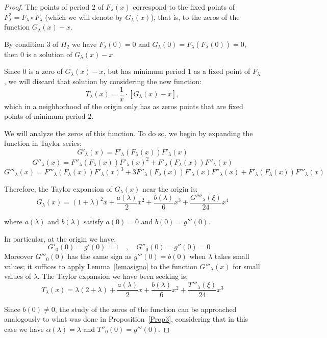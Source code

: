 \documentclass[12pt,a4paper]{report}
\theoremstyle{definition}
\begin{document}
\begin{proof}
The points of period \( 2 \) of \( F_{\lambda}(x) \) correspond to the fixed points of \( F^2_{\lambda} = F_{\lambda} \circ F_{\lambda} \) (which we will denote by \( G_{\lambda}(x) \)), that is, to the zeros of the function \( G_{\lambda}(x) - x \).

By condition 3 of \( H_2 \) we have \( F_{\lambda}(0) = 0 \) and \( G_{\lambda}(0) = F_{\lambda}(F_{\lambda}(0)) = 0 \), then \( 0 \) is a solution of \( G_{\lambda}(x) - x \).

Since $0$ is a zero of $G_\lambda(x)-x$, but has minimum period $1$ as a fixed point of $F_\lambda$, we will discard that solution by considering the new function:
\[
T_{\lambda}(x) = \frac{1}{x} \cdot [ G_{\lambda}(x) - x ],
\]
which in a neighborhood of the origin only has as zeros points that are fixed points of minimum period \( 2 \). 

We will analyze the zeros of this function. To do so, we begin by expanding the function in Taylor series:
\[
G'_{\lambda}(x) = F'_{\lambda}(F_{\lambda}(x)) F'_{\lambda}(x)
\]
\[
G''_{\lambda}(x) = F''_{\lambda}(F_{\lambda}(x)) F'_{\lambda}(x)^2 + F'_{\lambda}(F_{\lambda}(x)) F''_{\lambda}(x)
\]
\[
G'''_{\lambda}(x) = F'''_{\lambda}(F_{\lambda}(x)) F'_{\lambda}(x)^3 + 3 F''_{\lambda}(F_{\lambda}(x)) F'_{\lambda}(x) F''_{\lambda}(x) + F'_{\lambda}(F_{\lambda}(x)) F'''_{\lambda}(x)
\]

Therefore, the Taylor expansion of \( G_{\lambda}(x) \) near the origin is:
\[
G_{\lambda}(x) = (1 + \lambda)^2 x + \frac{a(\lambda)}{2} x^2 + \frac{b(\lambda)}{6} x^3 + \frac{G''''_{ \lambda}(\xi)}{24} x^4
\]


where \( a(\lambda) \) and \( b(\lambda) \) satisfy \( a(0) = 0 \) and \( b(0) = g'''(0) \). 

In particular, at the origin we have:
\[
G'_0(0) = g'(0) = 1 \quad , \quad G''_0(0) = g''(0) = 0 \quad 
\]
Moreover $G'''_0(0)$ has the same sign as $ g'''(0) = b(0)$ when $\lambda$ takes small values; it suffices to apply Lemma~\ref{lemasigno} to the function $G'''_\lambda(x)$ for small values of $\lambda$.
The Taylor expansion we have been seeking is:
\[
T_{\lambda}(x) = \lambda (2 + \lambda) + \frac{a(\lambda)}{2} x + \frac{b(\lambda)}{6} x^2 + \frac{T'''_{ \lambda}(\xi)}{24} x^3
\]

Since \( b(0) \neq 0 \), the study of the zeros of the function can be approached analogously to what was done in Proposition~\ref{Prop3}, considering that in this case we have \( \alpha(\lambda) = \lambda \) and \( T''_0(0) = g'''(0) \).  


\end{proof}
\end{document}

